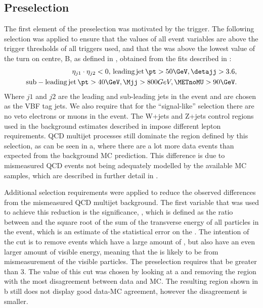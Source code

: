 \subsection{Preselection}
\label{sec:parkedpresel}
The first element of the preselection was motivated by the trigger. The following selection was applied to ensure that the values of all event variables are above the trigger thresholds of all triggers used, and that the \METnoMU was above the lowest value of the turn on centre, B, as defined in , obtained from the fits described in :
\begin{align}
  \label{eq:parkedprepresel}
  \begin{split}
  \eta_{j1}\cdot\eta_{j2}<0,\,\mathrm{leading\,jet\,}\pt>50 \GeV, \detajj>3.6, \\
  \mathrm{sub-leading\,jet\,}\pt>40 \GeV, \Mjj>800 GeV, \METnoMU>90\GeV.
  \end{split}
\end{align}
Where $j1$ and $j2$ are the leading and sub-leading \pt jets in the event and are chosen as the \ac{VBF} tag jets. We also require that for the ``signal-like'' selection there are no veto electrons or muons in the event. The W+jets and Z+jets control regions used in the background estimates described in  impose different lepton requirements. QCD multijet processes still dominate the region defined by this selection, as can be seen in a, where there are a lot more data events than expected from the background \ac{MC} prediction. This difference is due to mismeasured \ac{QCD} events not being adequately modelled by the available \ac{MC} samples, which are described in further detail in . 

Additional selection requirements were applied to reduce the observed differences from the mismeasured \ac{QCD} multijet background. The first variable that was used to achieve this reduction is the \MET significance, \METsig, which is defined as the ratio between \METnoMU and the square root of the sum of the transverse energy of all particles in the event, which is an estimate of the statistical error on the \MET. The intention of the \METsig cut is to remove events which have a large amount of \MET, but also have an even larger amount of visible energy, meaning that the \MET is likely to be from mismeasurement of the visible particles. The preselection requires that \METsig be greater than 3. The value of this cut was chosen by looking at a and removing the region with the most disagreement between data and \ac{MC}. The resulting region shown in b still does not display good data-\ac{MC} agreement, however the disagreement is smaller.

